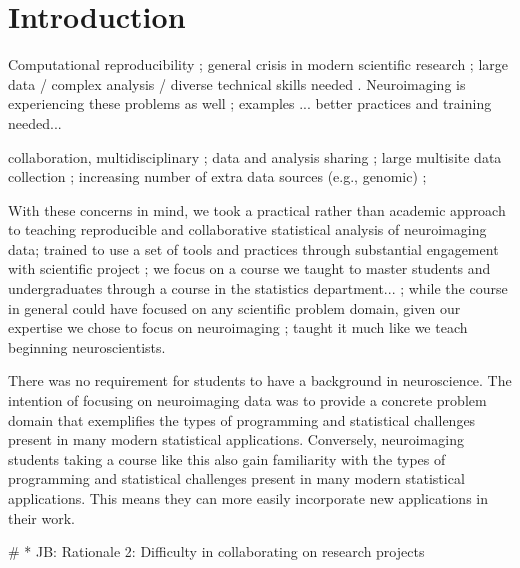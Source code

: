 \section{Introduction}

Computational reproducibility \citep{buckheit1995wavelab} ;
general crisis in modern scientific research ;
large data / complex analysis / diverse technical skills needed .
Neuroimaging is experiencing these problems as well ;
examples ...
better practices and training needed...

collaboration, multidisciplinary ;
data and analysis sharing ;
large multisite data collection ;
increasing number of extra data sources (e.g., genomic) ;

With these concerns in mind, we took a
practical rather than academic approach to teaching reproducible
and collaborative statistical analysis of neuroimaging data;
trained to use a set of tools and practices through substantial engagement
with scientific project ;
we focus on a course we taught to master students and undergraduates through
a course in the statistics department... ;
while the course in general could have focused on any scientific problem domain,
given our expertise we chose to focus on neuroimaging ;
taught it much like we teach beginning neuroscientists.

There was no requirement for students to have a background in neuroscience.
The intention of focusing on neuroimaging data was to provide a concrete problem
domain that exemplifies the types of programming and statistical challenges
present in many modern statistical applications.
Conversely, neuroimaging students taking a course like this also
gain familiarity with the types of programming and statistical challenges
present in many modern statistical applications.
This means they can more easily incorporate new applications
in their work.

# * JB: Rationale 2:  Difficulty in collaborating on research projects
\jb{
}

